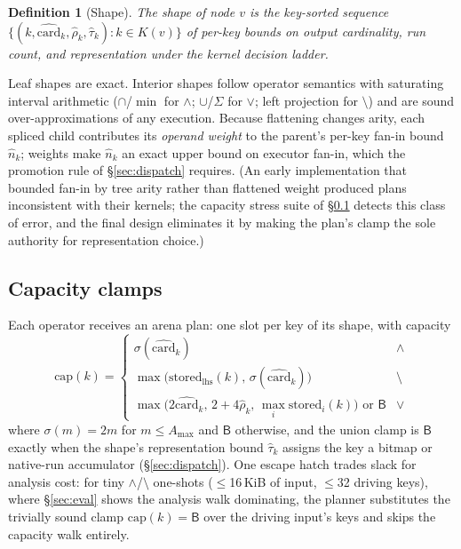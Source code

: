 \documentclass[sigconf,nonacm]{acmart}
\newcommand{\B}{\ensuremath{\mathsf{B}}}
\newcommand{\capm}{\ensuremath{\mathrm{cap}}}
\newcommand{\stored}{\ensuremath{\mathrm{stored}}}
\newtheorem{defx}{Definition}
\begin{document}
\begin{defx}[Shape]
The shape of node $v$ is the key-sorted sequence
$\{(k, \widehat{\mathrm{card}}_k, \widehat{\rho}_k, \widehat{\tau}_k) :
k \in K(v)\}$ of per-key bounds on output cardinality, run count, and
representation under the kernel decision ladder.
\end{defx}

Leaf shapes are exact. Interior shapes follow operator semantics with
saturating interval arithmetic ($\cap$/$\min$ for $\wedge$;
$\cup$/$\Sigma$ for $\vee$; left projection for $\setminus$) and are
sound over-approximations of any execution. Because flattening changes
arity, each spliced child contributes its \emph{operand weight} to the
parent's per-key fan-in bound $\widehat{n}_k$; weights make
$\widehat{n}_k$ an exact upper bound on executor fan-in, which the
promotion rule of \S\ref{sec:dispatch} requires. (An early
implementation that bounded fan-in by tree arity rather than flattened
weight produced plans inconsistent with their kernels; the capacity
stress suite of \S\ref{sec:clamps} detects this class of error, and the
final design eliminates it by making the plan's clamp the sole authority
for representation choice.)

\subsection{Capacity clamps}
\label{sec:clamps}

Each operator receives an arena plan: one slot per key of its shape,
with capacity
\[
\capm(k) =
\begin{cases}
\sigma(\widehat{\mathrm{card}}_k) & \wedge\\[2pt]
\max\big(\stored_{\mathrm{lhs}}(k),\, \sigma(\widehat{\mathrm{card}}_k)\big) & \setminus\\[2pt]
\max\big(2\widehat{\mathrm{card}}_k,\, 2{+}4\widehat{\rho}_k,\,
\max_i \stored_i(k)\big) \text{ or } \B & \vee
\end{cases}
\]
where $\sigma(m) = 2m$ for $m \le A_{\max}$ and $\B$ otherwise, and the
union clamp is $\B$ exactly when the shape's representation bound
$\widehat{\tau}_k$ assigns the key a bitmap or native-run accumulator
(\S\ref{sec:dispatch}). One escape hatch trades
slack for analysis cost: for tiny $\wedge$/$\setminus$ one-shots
($\le$16\,KiB of input, $\le$32 driving keys), where \S\ref{sec:eval}
shows the analysis walk dominating, the planner substitutes the
trivially sound clamp $\capm(k) = \B$ over the driving input's keys
and skips the capacity walk entirely.
\end{document}
